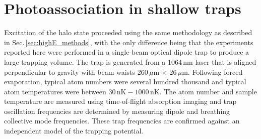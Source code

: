 
\section{Photoassociation in shallow traps} \label{sec:lowE_theory}
Excitation of the halo state proceeded using the same methodology as described in Sec.\,\ref{sec:highE_methods}, with the only difference being that the experiments reported here were performed in a single-beam optical dipole trap to produce a large trapping volume.
The trap is generated from a $1064\,\text{nm}$ laser that is aligned perpendicular to gravity with beam waists $260\,\mu\text{m}\,\times\,26\,\mu\text{m}$.
Following forced evaporation, typical atom numbers were several hundred thousand and typical atom temperatures were between $30\,\text{nK} - 1000\,\text{nK}$.
The atom number and sample temperature are measured using time-of-flight absorption imaging and trap oscillation frequencies are determined by measuring dipole and breathing collective mode frequencies.
These trap frequencies are confirmed against an independent model of the trapping potential.

